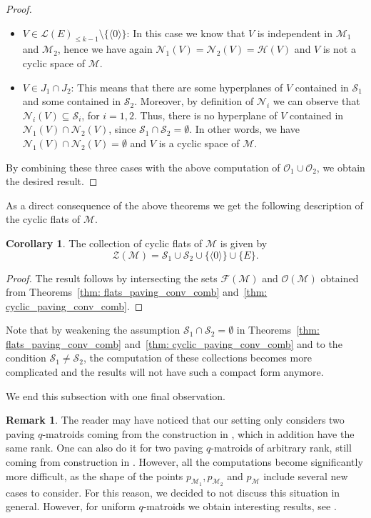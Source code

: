 \documentclass[a4paper,11pt,reqno]{amsart}
\theoremstyle{definition}
\newtheorem{remark}[theorem]{{{Remark}}}
\newtheorem{corollary}[theorem]{{{Corollary}}}%
\newcommand{\mM}{\mathcal{M}}
\newcommand{\mL}{\mathcal{L}}
\newcommand{\mF}{\mathcal{F}}
\newcommand{\mO}{\mathcal{O}}
\newcommand{\mZ}{\mathcal{Z}}
\newcommand{\mS}{\mathcal{S}}
\newcommand{\mN}{\mathcal{N}}
\newcommand{\mH}{\mathcal{H}}
\begin{document}
{\begin{proof}
\begin{itemize}
        \item $V\in\mL(E)_{\leq k-1}\setminus\{\langle 0\rangle\}$: In this case we know that $V$ is independent in $\mM_1$ and $\mM_2$, hence we have again $\mN_1(V)=\mN_2(V)=\mH(V)$ and $V$ is not a cyclic space of $\mM$.

        \item $V\in J_1\cap J_2$: This means that there are some hyperplanes of $V$ contained in $\mS_1$ and some contained in $\mS_2$. Moreover, by  definition of $\mN_i$ we can observe that $\mN_i(V)\subseteq\mS_i$, for $i=1,2$. Thus, there is no hyperplane of $V$ contained in $\mN_1(V)\cap\mN_2(V)$, since $\mS_1\cap\mS_2=\emptyset$. In other words, we have $\mN_1(V)\cap\mN_2(V)=\emptyset$ and $V$ is a cyclic space of $\mM$. 
    \end{itemize}
    By combining these three cases with the above computation of $\mO_1\cup\mO_2$, we obtain the desired result.
\end{proof}

As a direct consequence of the above theorems we get the following description of the cyclic flats of $\mM$.

\begin{corollary}\label{coro: cyclic_flats_paving_conv_comb}
   The collection of cyclic flats of $\mM$ is given by
    \[
        \mZ(\mM)=\mS_1\cup\mS_2\cup\{\langle 0\rangle\}\cup\{E\}.
    \]
\end{corollary}
\begin{proof}
The result follows by intersecting the sets $\mF(\mM)$ and $\mO(\mM)$ obtained from Theorems~\ref{thm: flats_paving_conv_comb} and~\ref{thm: cyclic_paving_conv_comb}.
\end{proof}

Note that by weakening the assumption $\mS_1\cap\mS_2=\emptyset$ in Theorems~\ref{thm: flats_paving_conv_comb} and~\ref{thm: cyclic_paving_conv_comb} and  to the condition $\mS_1\ne\mS_2$, the computation of these collections becomes more complicated and the results will not have such a compact form anymore.

We end this subsection with one final observation.

\begin{remark}
    The reader may have noticed that our setting only considers two paving $q$-matroids coming from the construction in , which in addition have the same rank. One can also do it for two paving $q$-matroids of arbitrary rank, still coming from construction in . However, all the computations become significantly more difficult, as the shape of the points $p_{\mM_1}, p_{\mM_2}$ and $p_{\mM}$ include several new cases to consider. For this reason, we decided to not discuss this situation in general. However, for uniform $q$-matroids we obtain interesting results, see .
\end{remark}

}
\end{document}
